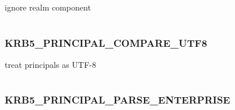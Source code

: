 \documentclass[letterpaper,10pt,english]{sphinxmanual}
\begin{document}
ignore realm component

\begin{tabulary}{\linewidth}{|L|L|}
\hline

 & 
\\\hline
\end{tabulary}



\subsubsection{KRB5\_PRINCIPAL\_COMPARE\_UTF8}
\label{appdev/refs/macros/KRB5_PRINCIPAL_COMPARE_UTF8:krb5-principal-compare-utf8-data}\label{appdev/refs/macros/KRB5_PRINCIPAL_COMPARE_UTF8::doc}\label{appdev/refs/macros/KRB5_PRINCIPAL_COMPARE_UTF8:krb5-principal-compare-utf8}

\begin{fulllineitems}
\label{appdev/refs/macros/KRB5_PRINCIPAL_COMPARE_UTF8:KRB5_PRINCIPAL_COMPARE_UTF8}
\end{fulllineitems}


treat principals as UTF-8

\begin{tabulary}{\linewidth}{|L|L|}
\hline

 & 
\\\hline
\end{tabulary}



\subsubsection{KRB5\_PRINCIPAL\_PARSE\_ENTERPRISE}
\label{appdev/refs/macros/KRB5_PRINCIPAL_PARSE_ENTERPRISE:krb5-principal-parse-enterprise-data}\label{appdev/refs/macros/KRB5_PRINCIPAL_PARSE_ENTERPRISE::doc}\label{appdev/refs/macros/KRB5_PRINCIPAL_PARSE_ENTERPRISE:krb5-principal-parse-enterprise}

\begin{fulllineitems}
\label{appdev/refs/macros/KRB5_PRINCIPAL_PARSE_ENTERPRISE:KRB5_PRINCIPAL_PARSE_ENTERPRISE}
\end{fulllineitems}
\end{document}
